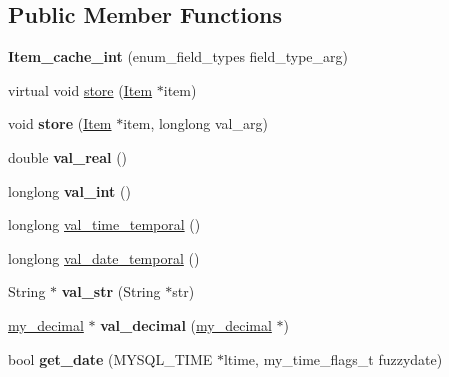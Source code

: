 \subsection*{Public Member Functions}
\begin{DoxyCompactItemize}
\item 
\mbox{\label{classItem__cache__int_a44c0e525918026439d2ed04566362907}} 
{\bfseries Item\+\_\+cache\+\_\+int} (enum\+\_\+field\+\_\+types field\+\_\+type\+\_\+arg)
\item 
virtual void \mbox{\hyperlink{classItem__cache__int_a657ce32793e936e705bf43fde85a2da4}{store}} (\mbox{\hyperlink{classItem}{Item}} $\ast$item)
\item 
\mbox{\label{classItem__cache__int_a9203abfec1c177f5ca85e9ee52d2931d}} 
void {\bfseries store} (\mbox{\hyperlink{classItem}{Item}} $\ast$item, longlong val\+\_\+arg)
\item 
\mbox{\label{classItem__cache__int_a136e0b0b8b840dea76497b338234dc05}} 
double {\bfseries val\+\_\+real} ()
\item 
\mbox{\label{classItem__cache__int_aa85b0ab9d7da8c28ce1b6e01b2051cef}} 
longlong {\bfseries val\+\_\+int} ()
\item 
longlong \mbox{\hyperlink{classItem__cache__int_af7bbf9ca88eac67901bc1e7c5768392a}{val\+\_\+time\+\_\+temporal}} ()
\item 
longlong \mbox{\hyperlink{classItem__cache__int_afea06afa547e7884db25240f67cfff0d}{val\+\_\+date\+\_\+temporal}} ()
\item 
\mbox{\label{classItem__cache__int_aa2a3b26e0c0a5404dffaa182f56c3f75}} 
String $\ast$ {\bfseries val\+\_\+str} (String $\ast$str)
\item 
\mbox{\label{classItem__cache__int_a3969c64f3242ef1e2ca1ace040b7f887}} 
\mbox{\hyperlink{classmy__decimal}{my\+\_\+decimal}} $\ast$ {\bfseries val\+\_\+decimal} (\mbox{\hyperlink{classmy__decimal}{my\+\_\+decimal}} $\ast$)
\item 
\mbox{\label{classItem__cache__int_a8309323db5f1a601f3d01cfd33519295}} 
bool {\bfseries get\+\_\+date} (M\+Y\+S\+Q\+L\+\_\+\+T\+I\+ME $\ast$ltime, my\+\_\+time\+\_\+flags\+\_\+t fuzzydate)

\end{DoxyCompactItemize}
